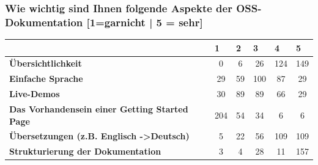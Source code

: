 \subsubsection*{Wie wichtig sind Ihnen folgende Aspekte der OSS-Dokumentation [1=garnicht | 5 = sehr]}
\begin{table}[h]
    \begin{tabular}{l|c|c|c|c|c|}
                                                                     & \multicolumn{1}{l|}{\textbf{1}} & \multicolumn{1}{l|}{\textbf{2}} & \multicolumn{1}{l|}{\textbf{3}} & \multicolumn{1}{l|}{\textbf{4}} & \multicolumn{1}{l|}{\textbf{5}} \\ \hline
        \textbf{Übersichtlichkeit}                                   & 0                               & 6                               & 26                              & 124                             & 149                             \\ \hline
        \textbf{Einfache Sprache}                                    & 29                              & 59                              & 100                             & 87                              & 29                              \\ \hline
        \textbf{Live-Demos}                                          & 30                              & 89                              & 89                              & 66                              & 29                              \\ \hline
        \textbf{Das Vorhandensein einer Getting Started Page}        & 204                             & 54                              & 34                              & 6                               & 6                               \\ \hline
        \textbf{Übersetzungen (z.B. Englisch -\textgreater Deutsch)} & 5                               & 22                              & 56                              & 109                             & 109                             \\ \hline
        \textbf{Strukturierung der Dokumentation}                    & 3                               & 4                               & 28                              & 11                              & 157                             \\ \hline
    \end{tabular}%
\end{table}


\newpage

